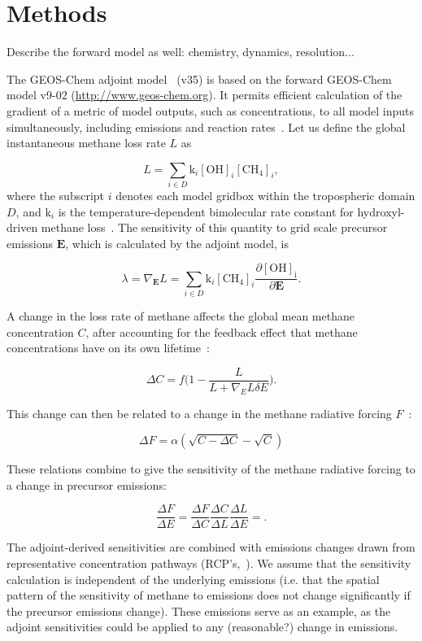 \section{Methods}

Describe the forward model as well: chemistry, dynamics, resolution...

The GEOS-Chem adjoint model~\cite{ref:henze2007} (v35) is based on the forward GEOS-Chem model v9-02 (\url{http://www.geos-chem.org}). It permits efficient calculation of the gradient of a metric of model outputs, such as concentrations, to all model inputs simultaneously, including emissions and reaction rates~\cite{ref:walker2015}. Let us define the global instantaneous methane loss rate $L$ as

\begin{equation}
L=\sum_{i \in D} \mathrm{k}_i \mathrm{[OH]}_i \mathrm{[CH_4]}_i,
\end{equation}
where the subscript $i$ denotes each model gridbox within the tropospheric domain $D$, and $\mathrm{k}_i$ is the temperature-dependent bimolecular rate constant for hydroxyl-driven methane loss~\citep{ref:sander2011}. The sensitivity of this quantity to grid scale precursor emissions $\mathbf{E}$, which is calculated by the adjoint model, is

\begin{equation}
\lambda = \nabla_\mathbf{E} L = \sum_{i \in D} \mathrm{k}_i \mathrm{[CH_4]}_i \frac{\partial \mathrm{[OH]_i}}{\partial \mathbf{E}}.
\end{equation}

A change in the loss rate of methane affects the global mean methane concentration $C$, after accounting for the feedback effect that methane concentrations have on its own lifetime~\citep{ref:naik2005}:

\begin{equation}
\Delta C = f\big(1 - \frac{L}{L+\nabla_E L \delta E}\big).
\end{equation}

This change can then be related to a change in the methane radiative forcing $F$~\citep{ref:myhre1998}:

\begin{equation}
\Delta F = \alpha (\sqrt{C-\Delta C} - \sqrt{C})
\end{equation}

These relations combine to give the sensitivity of the methane radiative forcing to a change in precursor emissions:

\begin{equation}
\frac{\Delta F}{\Delta E} = \frac{\Delta F}{\Delta C} \frac{\Delta C}{\Delta L} \frac{\Delta L}{\Delta E} = .
\end{equation}

The adjoint-derived sensitivities are combined with emissions changes drawn from representative concentration pathways (RCP's,~\citet{ref:vanvuuren2011}). We assume that the sensitivity calculation is independent of the underlying emissions (i.e. that the spatial pattern of the sensitivity of methane to emissions does not change significantly if the precursor emissions change). These emissions serve as an example, as the adjoint sensitivities could be applied to any (reasonable?) change in emissions.